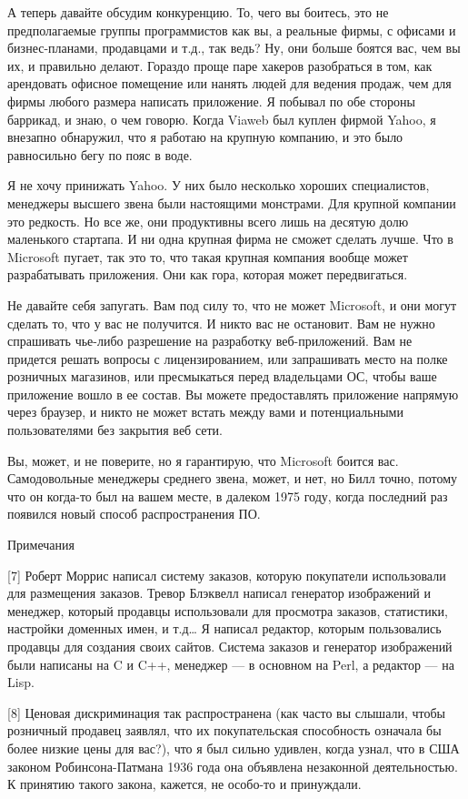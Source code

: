 \documentclass[ebook,12pt,oneside,openany]{memoir}
\begin{document}
А теперь давайте обсудим конкуренцию. То, чего вы боитесь, это не
предполагаемые группы программистов как вы, а реальные фирмы, с
офисами и бизнес-планами, продавцами и т.д., так ведь? Ну, они больше
боятся вас, чем вы их, и правильно делают. Гораздо проще паре хакеров
разобраться в том, как арендовать офисное помещение или нанять людей
для ведения продаж, чем для фирмы любого размера написать приложение.
Я побывал по обе стороны баррикад, и знаю, о чем говорю. Когда Viaweb
был куплен фирмой Yahoo, я внезапно обнаружил, что я работаю на
крупную компанию, и это было равносильно бегу по пояс в воде.

Я не хочу принижать Yahoo. У них было несколько хороших специалистов,
менеджеры высшего звена были настоящими монстрами. Для крупной
компании это редкость. Но все же, они продуктивны всего лишь на
десятую долю маленького стартапа. И ни одна крупная фирма не сможет
сделать лучше. Что в Microsoft пугает, так это то, что такая крупная
компания вообще может разрабатывать приложения. Они как гора, которая
может передвигаться.

Не давайте себя запугать. Вам под силу то, что не может Microsoft, и
они могут сделать то, что у вас не получится. И никто вас не
остановит. Вам не нужно спрашивать чье-либо разрешение на разработку
веб-приложений. Вам не придется решать вопросы с лицензированием, или
запрашивать место на полке розничных магазинов, или пресмыкаться перед
владельцами ОС, чтобы ваше приложение вошло в ее состав. Вы можете
предоставлять приложение напрямую через браузер, и никто не может
встать между вами и потенциальными пользователями без закрытия веб
сети.

Вы, может, и не поверите, но я гарантирую, что Microsoft боится вас.
Самодовольные менеджеры среднего звена, может, и нет, но Билл точно,
потому что он когда-то был на вашем месте, в далеком 1975 году, когда
последний раз появился новый способ распространения ПО.

Примечания

[7] Роберт Моррис написал систему заказов, которую покупатели
использовали для размещения заказов. Тревор Блэквелл написал генератор
изображений и менеджер, который продавцы использовали для просмотра
заказов, статистики, настройки доменных имен, и т.д… Я написал
редактор, которым пользовались продавцы для создания своих сайтов.
Система заказов и генератор изображений были написаны на C и C++,
менеджер — в основном на Perl, а редактор — на Lisp.

[8] Ценовая дискриминация так распространена (как часто вы слышали,
чтобы розничный продавец заявлял, что их покупательская способность
означала бы более низкие цены для вас?), что я был сильно удивлен,
когда узнал, что в США законом Робинсона-Патмана 1936 года она
объявлена незаконной деятельностью. К принятию такого закона, кажется,
не особо-то и принуждали.
\end{document}
